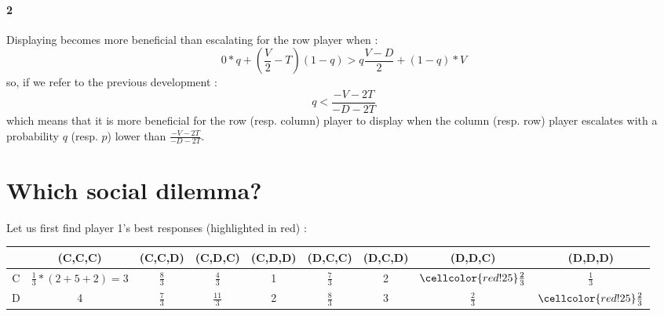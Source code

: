 \documentclass[a4paper]{article}
\begin{document}
\paragraph{2} Displaying becomes more beneficial than escalating for the
row player when : 
$$ 0*q + (\frac{V}{2} - T) (1-q) > q\frac{V-D}{2} + (1-q)*V$$
so, if we refer to the previous development : 
$$ q <  \frac{-V-2T}{-D-2T} $$ 
which means that it is more beneficial for the row (resp. column) player to 
display when the column (resp. row) player escalates with a probability $q$
(resp. $p$) lower than $\frac{-V-2T}{-D-2T}$. 


\section{Which social dilemma?}
Let us first find player 1's best responses (highlighted in red) :\\ 
\begin{table}[H]
\begin{tabular}{c|c|c|c|c|c|c|c|c}
	& (C,C,C) & (C,C,D) & (C,D,C) & (C,D,D)
	& (D,C,C) & (D,C,D) & (D,D,C) & (D,D,D)\\
	\hline
	C & $\frac{1}{3} * (2 + 5 + 2 ) = 3 $ &
		\cellcolor{red!25} $\frac{8}{3}$ &$\frac{4}{3}$ & 1 &
		$\frac{7}{3}$ & 2 & $\cellcolor{red!25} \frac{2}{3}$ &
		$\frac{1}{3}$ \\
	\hline
	D & \cellcolor{red!25} 4 & $\frac{7}{3}$ & 
		\cellcolor{red!25} $\frac{11}{3}$ & \cellcolor{red!25} 2
		& \cellcolor{red!25} $\frac{8}{3}$ & \cellcolor{red!25} 3 
		& \cellcolor{red!25} $\frac{2}{3}$ & 
		$\cellcolor{red!25} \frac{2}{3}$ \\
\end{tabular}
\end{table}
\end{document}
